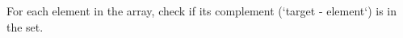 \documentclass[preview]{standalone}
\begin{document}
For each element in the array, check if its complement (`target - element`) is in the set.\\
\end{document}
